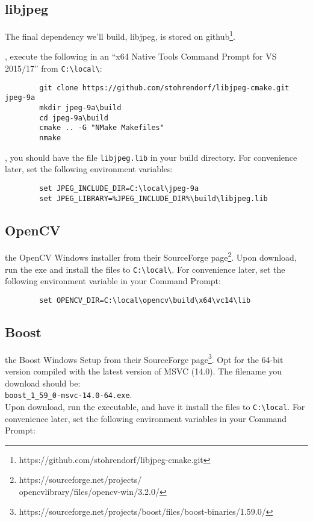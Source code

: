 \documentclass{tufte-handout}
\begin{document}
\subsection{libjpeg}

    The final dependency we'll build, libjpeg,  is stored on 
    github\footnote{https://github.com/stohrendorf/libjpeg-cmake.git}.

    , execute the following in an ``x64 Native Tools Command
    Prompt for VS 2015/17'' from \Verb|C:\local\|:

    \begin{lstlisting}
        git clone https://github.com/stohrendorf/libjpeg-cmake.git jpeg-9a
        mkdir jpeg-9a\build
        cd jpeg-9a\build
        cmake .. -G "NMake Makefiles"
        nmake
    \end{lstlisting}

    , you should have the file \Verb|libjpeg.lib| in your build
    directory.  For convenience later, set the following environment variables:

    \begin{lstlisting}
        set JPEG_INCLUDE_DIR=C:\local\jpeg-9a
        set JPEG_LIBRARY=%JPEG_INCLUDE_DIR%\build\libjpeg.lib
    \end{lstlisting}

\subsection{OpenCV}

     the OpenCV Windows installer from their SourceForge 
    page\footnote{https://sourceforge.net/projects/\\ opencvlibrary/files/opencv-win/3.2.0/}.  Upon
    download, run the exe and install the files to \Verb|C:\local\|.  For convenience later,
    set the following environment variable in your Command Prompt:

    \begin{lstlisting}
        set OPENCV_DIR=C:\local\opencv\build\x64\vc14\lib
    \end{lstlisting}

\subsection{Boost}

     the Boost Windows Setup from their SourceForge 
    page\footnote{https://sourceforge.net/projects/boost/files/boost-binaries/1.59.0/}.  Opt for
    the 64-bit version compiled with the latest version of MSVC (14.0).  The filename you download
    should be:\\ \Verb|boost_1_59_0-msvc-14.0-64.exe|.\\  Upon download, run the executable, and 
    have it install the files to \Verb|C:\local|.  For convenience later,
    set the following environment variables in your Command Prompt:
\end{document}
